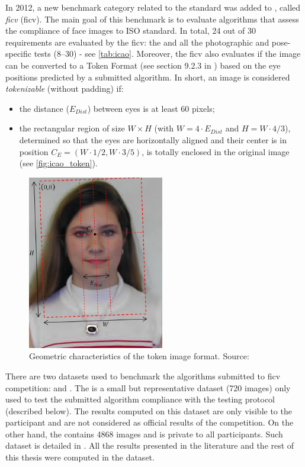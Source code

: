 In 2012, a new benchmark category related to the \icao standard was added to \fvcongoing \citep{ferrara2012face}, called \textit{\acl{ficv}} (\acs{ficv}). The main goal of this benchmark is to evaluate algorithms that assess the compliance of face images to ISO standard. In total, 24 out of 30 requirements are evaluated by the \acs{ficv}: the \citeReq{\eyecenterlocation} and all the photographic and pose-specific tests (8--30) - see \autoref{tab:icao}. Moreover, the \acs{ficv} also evaluates if the image can be converted to a Token Format (see section 9.2.3 in \citep{iso-iec}) based on the eye positions predicted by a submitted algorithm. In short, an image is considered \textit{tokenizable} (without padding) if:

\begin{itemize}
\item the distance ($E_{Dist}$) between eyes is at least 60 pixels;
\item the rectangular region of size $W \times H$ (with $W=4\cdot E_{Dist}$ and $H=W \cdot 4/3$), determined so that the eyes are horizontally aligned and their center is in position $C_E=(W\cdot1/2,W\cdot3/5)$, is totally enclosed in the original image (see \autoref{fig:icao_token}).
\end{itemize}

\begin{figure}[ht]
    \centering
    \includegraphics[height=3.0in]{images/icao_tokenizable.png}
    \caption{Geometric characteristics of the token image format. Source: \citep{fvcongoing}}
    \label{fig:icao_token}
\end{figure}

There are two datasets used to benchmark the algorithms submitted to \acs{ficv} competition: \ficvtest and \ficvofficial. The \ficvtest is a small but representative dataset (720 images) only used to test the submitted algorithm compliance with the testing protocol (described below). The results computed on this dataset are only visible to the participant and are not considered as official results of the competition. On the other hand, the \ficvofficial contains 4868 images and is private to all participants. Such dataset is detailed in \cite{ferrara2012face}. All the results presented in the literature and the rest of this thesis were computed in the \ficvofficial dataset.

